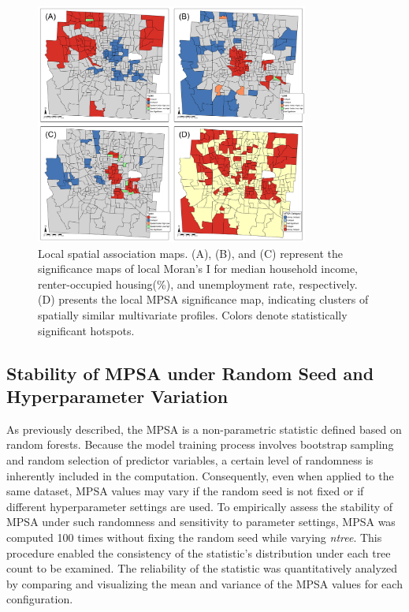 \documentclass[
  a4paper,
  12pt]{article}
\begin{document}
\begin{figure}[htb]
\centering
\includegraphics[width=0.8\textwidth]{output/robustness/data_description.png}
\caption{\small Local spatial association maps. (A), (B), and (C) represent the significance maps of local Moran’s I for median household income, renter-occupied housing(\%), and unemployment rate, respectively. (D) presents the local MPSA significance map, indicating clusters of spatially similar multivariate profiles. Colors denote statistically significant hotspots.}
\label{fig:data_description}
\end{figure}

\subsection{Stability of MPSA under Random Seed and Hyperparameter
Variation}\label{stability-of-mpsa-under-random-seed-and-hyperparameter-variation}

As previously described, the MPSA is a non-parametric statistic defined
based on random forests. Because the model training process involves
bootstrap sampling and random selection of predictor variables, a
certain level of randomness is inherently included in the computation.
Consequently, even when applied to the same dataset, MPSA values may
vary if the random seed is not fixed or if different hyperparameter
settings are used. To empirically assess the stability of MPSA under
such randomness and sensitivity to parameter settings, MPSA was computed
100 times without fixing the random seed while varying \emph{ntree}.
This procedure enabled the consistency of the statistic's distribution
under each tree count to be examined. The reliability of the statistic
was quantitatively analyzed by comparing and visualizing the mean and
variance of the MPSA values for each configuration. \vspace{1em}
\end{document}
